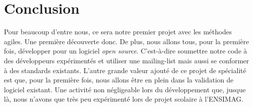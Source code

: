 \documentclass[11pt]{article}
\begin{document}
\section{Conclusion}

Pour beaucoup d'entre nous, ce sera notre premier projet avec les méthodes agiles. Une première découverte donc. De plus, nous allons tous, pour la première fois, développer pour un logiciel \textit{open source}. C'est-à-dire soumettre notre code à des développeurs expérimentés et utiliser une mailing-list mais aussi se conformer à des standards existants. L'autre grande valeur ajouté de ce projet de spécialité est que, pour la première fois, nous allons être en plein dans la validation de logiciel existant. Une activité non négligeable lors du développement que, jusque là, nous n'avons que très peu expérimenté lors de projet scolaire à l'ENSIMAG. 
\end{document}
